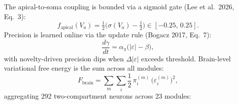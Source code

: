 \documentclass[11pt,a4paper]{article}
\begin{document}
The apical-to-soma coupling is bounded via a sigmoid gate
(Lee et al.~2026, Eq.~3):
\begin{equation}
  f_\text{apical}(V_a) = \tfrac{1}{2}\bigl(\sigma(V_a) - \tfrac{1}{2}\bigr)
  \in [-0.25,\, 0.25].
\end{equation}
Precision is learned online via the update rule (Bogacz 2017, Eq.~7):
\begin{equation}
  \frac{d\gamma}{dt} = \alpha_\pi \bigl(|\varepsilon| - \beta\bigr),
\end{equation}
with novelty-driven precision dips when $\Delta|\varepsilon|$ exceeds threshold.
Brain-level variational free energy is the sum across all modules:
\begin{equation}\label{eq:total_fe}
  F_\text{brain} = \sum_{m} \sum_{i} \frac{1}{2}\,\pi_i^{(m)}\,
  \bigl(\varepsilon_i^{(m)}\bigr)^2,
\end{equation}
aggregating 292 two-compartment neurons across 23 modules:
\end{document}
